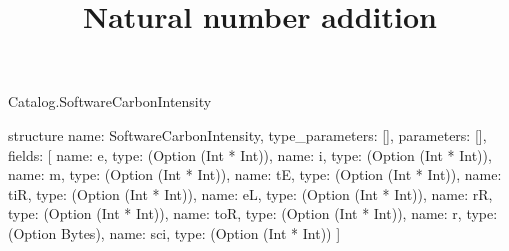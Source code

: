 \begin{lexlean}{Catalog.SoftwareCarbonIntensity}
\title{Natural number addition}
\begin{semanticmodule}
structure{
  name: SoftwareCarbonIntensity,
  type_parameters: [],
  parameters: [],
  fields: [
    {name: e, type: (Option (Int * Int))},
    {name: i, type: (Option (Int * Int))},
    {name: m, type: (Option (Int * Int))},
    {name: tE, type: (Option (Int * Int))},
    {name: tiR, type: (Option (Int * Int))},
    {name: eL, type: (Option (Int * Int))},
    {name: rR, type: (Option (Int * Int))},
    {name: toR, type: (Option (Int * Int))},
    {name: r, type: (Option Bytes)},
    {name: sci, type: (Option (Int * Int))}
  ]
}
\end{semanticmodule}
\end{lexlean}
